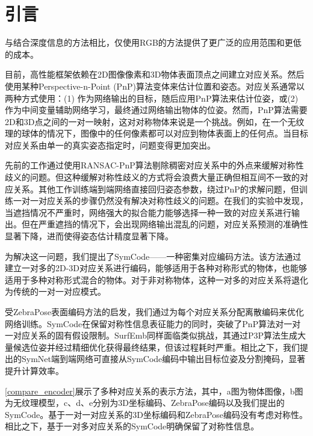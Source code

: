 \section{引言}
\par 与结合深度信息\cite{9191119, 9429889, 9933183, 9206072, 2024hipose}的方法相比，仅使用RGB的方法\cite{8765585, billings2019silhonet, hybridpose}提供了更广泛的应用范围和更低的成本。

目前，高性能框架\cite{wang2021gdr, su2022zebrapose}依赖在2D图像像素和3D物体表面顶点之间建立对应关系。然后使用某种Perspective-n-Point (PnP)算法\cite{EPnP}变体来估计位置和姿态。对应关系通常以两种方式使用：(1) 作为网络输出的目标\cite{su2022zebrapose}，随后应用PnP算法来估计位姿，或(2) 作为中间变量辅助网络学习，最终通过网络输出物体的位姿\cite{wang2021gdr}。然而，PnP算法需要2D和3D点之间的一对一映射，这对对称物体来说是一个挑战。例如，在一个无纹理的球体的情况下，图像中的任何像素都可以对应到物体表面上的任何点。当目标对应关系由单一的真实姿态指定时，问题变得更加突出。

先前的工作\cite{pvnet, park2019pix2pose, su2022zebrapose}通过使用RANSAC-PnP算法剔除稠密对应关系中的外点来缓解对称性歧义的问题。但这种缓解对称性歧义的方式将会浪费大量正确但相互间不一致的对应关系。其他工作\cite{wang2021gdr, di2021so}训练端到端网络直接回归姿态参数，绕过PnP的求解问题，但训练一对一对应关系的步骤仍然没有解决对称性歧义的问题。在我们的实验中发现，当遮挡情况不严重时，网络强大的拟合能力能够选择一种一致的对应关系进行输出。但在严重遮挡的情况下，会出现网络输出混乱的问题，对应关系预测的准确性显著下降，进而使得姿态估计精度显著下降。

\par 为解决这一问题，我们提出了SymCode——一种密集对应编码方法。该方法通过建立一对多的2D-3D对应关系进行编码，能够适用于各种对称形式的物体，也能够适用于多种对称形式混合的物体。对于非对称物体，这种一对多的对应关系将退化为传统的一对一对应模式。

\par 受ZebraPose\cite{su2022zebrapose}表面编码方法的启发，我们通过为每个对应关系分配离散编码来优化网络训练。SymCode在保留对称性信息表征能力的同时，突破了PnP算法对一对一对应关系的固有假设限制。SurfEmb\cite{haugaard2022surfemb}同样面临类似挑战，其通过P3P算法生成大量候选位姿并经过精细优化获得最终结果，但该过程耗时严重。相比之下，我们提出的SymNet端到端网络可直接从SymCode编码中输出目标位姿及分割掩码，显著提升计算效率。

\par \autoref{compare_encoder}展示了多种对应关系的表示方法，其中，a图为物体图像，b图为无纹理模型，c、d、e分别为3D坐标编码、ZebraPose编码\cite{su2022zebrapose}以及我们提出的SymCode。基于一对一对应关系的3D坐标编码和ZebraPose编码没有考虑对称性。相比之下，基于一对多对应关系的SymCode明确保留了对称性信息。

